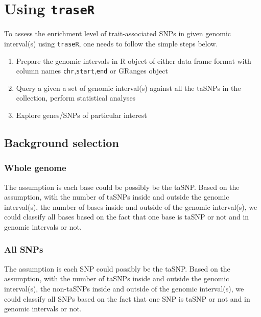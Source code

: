 \documentclass{article}
\begin{document}
\section{Using {\tt traseR}}
To assess the enrichment level of trait-associated SNPs in given genomic interval(s) using {\tt traseR}, one needs to
follow the simple steps below.
\begin{enumerate}
\item Prepare the genomic intervals in R object of either data frame format with column names {\tt chr},{\tt start},{\tt end} or GRanges object
\item Query a given a set of genomic interval(s) against all the taSNPs in the collection, perform statistical analyses
\item Explore genes/SNPs of particular interest
\end{enumerate}


\subsection{Background selection}
\subsubsection{Whole genome}
The assumption is each base could be possibly be the taSNP. Based on the assumption, with the number of taSNPs inside and outside the genomic interval(s), the number of bases inside and outside of the genomic interval(s), we could classify all bases based on the fact that one base is taSNP or not and in genomic intervals or not.

\subsubsection{All SNPs}
The assumption is each SNP could possibly be the taSNP. Based on the assumption, with the number of taSNPs inside and outside the genomic interval(s), the non-taSNPs inside and outside of the genomic interval(s), we could classify all SNPs based on the fact that one SNP is taSNP or not and in genomic intervals or not.
\end{document}

